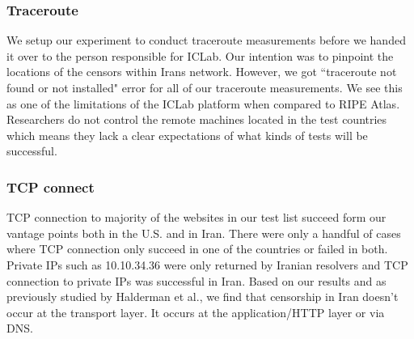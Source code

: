 \subsubsection{Traceroute} We setup our experiment to conduct traceroute measurements before we handed it over to the person responsible for ICLab. Our intention was to pinpoint the locations of the censors within Iran\textquotesingle s network. However, we got ``traceroute not found or not installed" error for all of our traceroute measurements. We see this as one of the limitations of the ICLab platform when compared to RIPE Atlas. Researchers do not control the remote machines located in the test countries which means they lack a clear expectations of what kinds of tests will be successful. \\
\subsubsection{TCP connect} 
TCP connection to majority of the websites in our test list succeed form our vantage points both in the U.S. and in Iran. There were only a handful of cases where TCP connection only succeed in one of the countries or failed in both. Private IPs such as 10.10.34.36 were only returned by Iranian resolvers and TCP connection to private IPs was successful in Iran. Based on our results and as previously studied by Halderman et al., we find that censorship in Iran doesn't occur at the transport layer. It occurs at the application/HTTP layer or via DNS.
